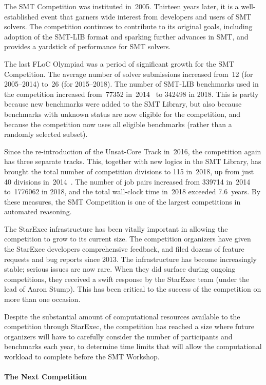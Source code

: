 \documentclass[dvipsnames,table,twoside,11pt]{article}
\newcommand{\ucoretrack}{Unsat-Core Track\xspace}
\begin{document}
The SMT Competition was instituted in~2005.  Thirteen years later, it
is a well-established event that garners wide interest from developers
and users of SMT solvers.  The competition continues to contribute to
its original goals, including adoption of the SMT-LIB format and
sparking further advances in SMT, and provides a yardstick of
performance for SMT solvers.

The last FLoC Olympiad was a period of significant growth for the SMT
Competition.  The average number of solver submissions increased
from~12 (for 2005--2014) to~26 (for 2015--2018).  The number of
SMT-LIB benchmarks used in the competition increased from~\num{77352}
in~2014~\cite{CDW14} to \num{342498} in 2018.  This is partly because new
benchmarks were added to the SMT Library, but also because benchmarks
with unknown status are now eligible for the competition, and because
the competition now uses all eligible benchmarks (rather than a
randomly selected subset).

Since the re-introduction of the \ucoretrack in~2016, the
competition again has three separate tracks.  This, together with new
logics in the SMT Library, has brought the total number of competition
divisions to 115 in~2018, up from just 40 divisions
in~2014~\cite{CDW14}.  The number of job pairs increased from \num{339714}
in~2014 to~\num{1776062} in 2018, and the total wall-clock time in~2018
exceeded 7.6~years.  By these measures, the SMT Competition is one of
the largest competitions in automated reasoning.

The StarExec infrastructure has been vitally important in allowing the
competition to grow to its current size.  The competition organizers
have given the StarExec developers comprehensive feedback, and filed
dozens of feature requests and bug reports since 2013.  The
infrastructure has become increasingly stable; serious issues are now
rare.  When they did surface during ongoing competitions, they
received a swift response by the StarExec team (under the lead of
Aaron Stump).  This has been critical to the success of the
competition on more than one occasion.

Despite the substantial amount of computational resources available to
the competition through StarExec, the competition has reached a size
where future organizers will have to carefully consider the number of
participants and benchmarks each year, to determine time limits that
will allow the computational workload to complete before the SMT
Workshop.

\paragraph{The Next Competition}
\end{document}
